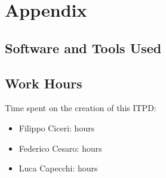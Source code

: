\section{Appendix}

	\subsection{Software and Tools Used}
	
	\subsection{Work Hours}
		Time spent on the creation of this ITPD:
		\begin{itemize}
			\item Filippo Ciceri:  hours
			\item Federico Cesaro:  hours
			\item Luca Capecchi:  hours
		\end{itemize}

